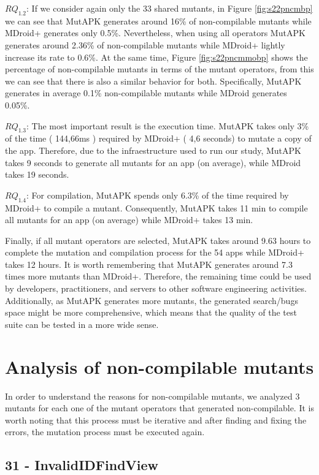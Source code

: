 \textbf{\textit{$RQ_{1.2}$}}: If we consider again only the 33 shared mutants, in Figure \ref{fig:s22pncmbp} we can see that MutAPK generates around 16\% of non-compilable mutants while MDroid+ generates only 0.5\%. Nevertheless, when using all operators MutAPK generates around 2.36\% of non-compilable mutants while MDroid+ lightly increase its rate to 0.6\%. At the same time, Figure \ref{fig:s22pncmmobp} shows the percentage of non-compilable mutants in terms of the mutant operators, from this we can see that there is also a similar behavior for both. Specifically, MutAPK generates in average 0.1\% non-compilable mutants while MDroid generates 0.05\%.

\textbf{\textit{$RQ_{1.3}$}}: The most important result is the execution time. MutAPK takes only 3\% of the time ( 144,66ms ) required by MDroid+ ( 4,6 seconds) to mutate a copy of the app. Therefore, due to the infraestructure used to run our study, MutAPK takes 9 seconds to generate all mutants for an app (on average), while MDroid takes 19 seconds. 

\textbf{\textit{$RQ_{1.4}$}}: For compilation, MutAPK spends only 6.3\% of the time required by MDroid+ to compile a mutant. Consequently, MutAPK takes 11 min to compile all mutants for an app (on average) while MDroid+ takes 13 min.


Finally, if all mutant operators are selected, MutAPK takes around 9.63 hours to complete the mutation and compilation process for the 54 apps while MDroid+ takes 12 hours.  It is worth remembering that MutAPK generates around 7.3 times more mutants than MDroid+. Therefore, the remaining time could be used by developers,  practitioners, and servers to other software engineering activities. Additionally, as MutAPK generates more mutants, the generated search/bugs space  might be more comprehensive, which means that the quality of the test suite can be tested in a more wide sense.

\section{Analysis of non-compilable mutants}

In order to understand the reasons for non-compilable mutants, we analyzed 3 mutants for each one of the mutant operators that generated non-compilable. It is worth noting that this process must be iterative and after finding and fixing the errors, the mutation process must be executed again.

\subsection{31 - InvalidIDFindView}


